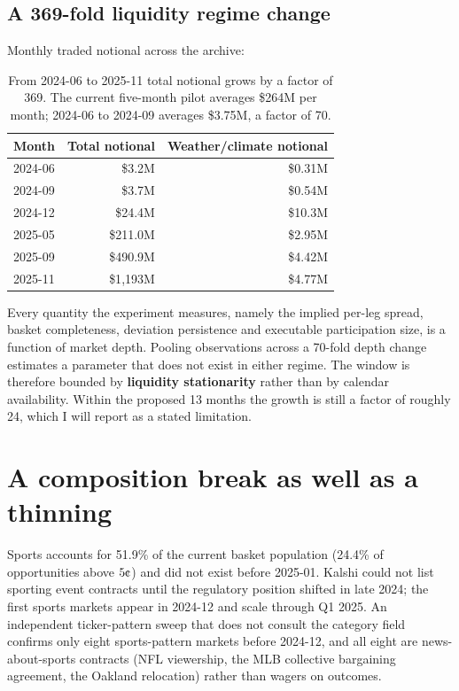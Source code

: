 \documentclass[11pt,a4paper]{article}
\newcommand{\cent}{\text{\textcent}}
\begin{document}
\subsection{A 369-fold liquidity regime change}

Monthly traded notional across the archive:

\begin{table}[ht]
\centering
\begin{tabular}{lrr}
\toprule
Month & Total notional & Weather/climate notional \\
\midrule
2024-06 & \$3.2M & \$0.31M \\
2024-09 & \$3.7M & \$0.54M \\
2024-12 & \$24.4M & \$10.3M \\
2025-05 & \$211.0M & \$2.95M \\
2025-09 & \$490.9M & \$4.42M \\
2025-11 & \$1{,}193M & \$4.77M \\
\bottomrule
\end{tabular}
\caption{From 2024-06 to 2025-11 total notional grows by a factor of 369. The
current five-month pilot averages \$264M per month; 2024-06 to
2024-09 averages \$3.75M, a factor of 70.}
\end{table}

Every quantity the experiment measures, namely the implied per-leg spread,
basket completeness, deviation persistence and executable participation size,
is a function of market depth. Pooling observations across a 70-fold depth
change estimates a parameter that does not exist in either regime. The window
is therefore bounded by \textbf{liquidity stationarity} rather than by
calendar availability. Within the proposed 13 months the growth is still a
factor of roughly 24, which I will report as a stated limitation.

\section{A composition break as well as a thinning}

Sports accounts for 51.9\% of the current basket population (24.4\% of
opportunities above $5\cent$) and did not exist before 2025-01. Kalshi could
not list sporting event contracts until the regulatory position shifted in
late 2024; the first sports markets appear in 2024-12 and scale through Q1
2025. An independent ticker-pattern sweep that does not consult the category
field confirms only eight sports-pattern markets before 2024-12, and all eight
are news-about-sports contracts (NFL viewership, the MLB collective
bargaining agreement, the Oakland relocation) rather than wagers on outcomes.
\end{document}
